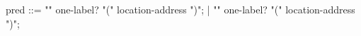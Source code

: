 \begin{syntax}
  pred ::=  "\initialized"  one-label? "(" location-address ")";
       | "\dangling"  one-label? "(" location-address ")";
       \
\end{syntax}

